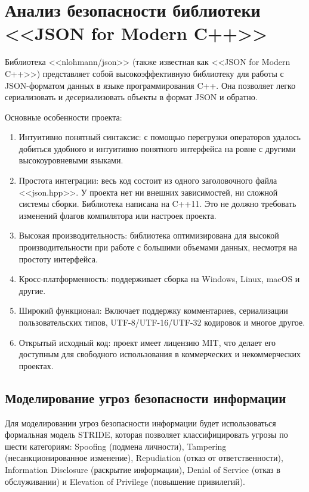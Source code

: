 \newpage

\section{Анализ безопасности библиотеки <<JSON for Modern C++>>}

Библиотека <<nlohmann/json>> (также известная как <<JSON for Modern C++>>) представляет собой высокоэффективную библиотеку для работы с JSON-форматом данных в языке программирования C++. Она позволяет легко сериализовать и десериализовать объекты в формат JSON и обратно.

Основные особенности проекта:
\begin{enumerate}
    \item Интуитивно понятный синтаксис: с помощью перегрузки операторов удалось добиться удобного и интуитивно понятного интерфейса на ровне с другими высокоуровневыми языками.
    \item Простота интеграции: весь код состоит из одного заголовочного файла <<json.hpp>>. У проекта нет ни внешних зависимостей, ни сложной системы сборки. Библиотека написана на C++11. Это не должно требовать изменений флагов компилятора или настроек проекта.
    \item Высокая производительность: библиотека оптимизирована для высокой производительности при работе с большими объемами данных, несмотря на простоту интерфейса.
    \item Кросс-платформенность: поддерживает сборка на Windows, Linux, macOS и другие.
    \item Широкий функционал: Включает поддержку комментариев, сериализации пользовательских типов, UTF-8/UTF-16/UTF-32 кодировок и многое другое.
    \item Открытый исходный код: проект имеет лицензию MIT, что делает его доступным для свободного использования в коммерческих и некоммерческих проектах.
\end{enumerate}

\subsection{Моделирование угроз безопасности информации}

Для моделировании угроз безопасности информации будет использоваться формальная модель STRIDE, которая позволяет классифицировать угрозы по шести категориям: Spoofing (подмена личности), Tampering (несанкционированное изменение), Repudiation (отказ от ответственности), Information Disclosure (раскрытие информации), Denial of Service (отказ в обслуживании) и Elevation of Privilege (повышение привилегий).

